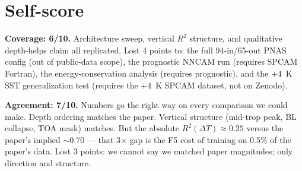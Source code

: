 \documentclass[11pt]{article}
\begin{document}
\section{Self-score}
\textbf{Coverage: 6/10.} Architecture sweep, vertical $R^2$ structure, and
qualitative depth-helps claim all replicated. Lost 4 points to:
the full 94-in/65-out PNAS config (out of public-data scope), the
prognostic NNCAM run (requires SPCAM Fortran), the energy-conservation
analysis (requires prognostic), and the $+4$~K SST generalization test
(requires the $+4$~K SPCAM dataset, not on Zenodo).

\textbf{Agreement: 7/10.} Numbers go the right way on every comparison we
could make. Depth ordering matches the paper. Vertical structure
(mid-trop peak, BL collapse, TOA mask) matches. But the absolute
$R^2(\Delta T) \approx 0.25$ versus the paper's implied $\sim$0.70 ---
that 3$\times$ gap is the F5 cost of training on 0.5\% of the paper's
data. Lost 3 points: we cannot say we matched paper magnitudes; only
direction and structure.
\end{document}
